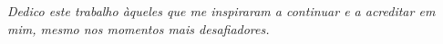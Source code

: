 \begin{dedicatoria}
   \vspace*{\fill}
   \centering
   \noindent

   \textit{Dedico este trabalho àqueles que me inspiraram a continuar e a acreditar em mim, mesmo nos momentos mais desafiadores.} \vspace*{\fill}
\end{dedicatoria}
